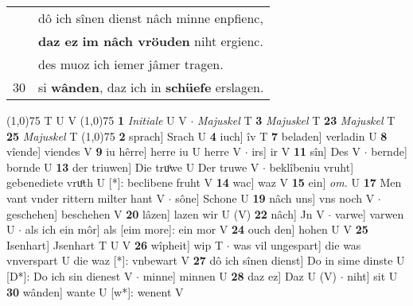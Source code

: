 \documentclass[8pt,a4paper,notitlepage]{article}
\begin{document}
\begin{table}[ht]
\begin{minipage}[t]{0.5\linewidth}
\begin{tabular}{rl}
 & dô ich sînen dienst nâch minne enpfienc,\\ 
 & \textbf{daz ez} \textbf{im nâch vröuden} niht ergienc.\\ 
 & des muoz ich iemer jâmer tragen.\\ 
30 & si \textbf{wânden}, daz ich in \textbf{schüefe} erslagen.\\ 
\end{tabular}
\scriptsize
\line(1,0){75} \newline
T U V \newline
\line(1,0){75} \newline
\textbf{1} \textit{Initiale} U V   $\cdot$ \textit{Majuskel} T  \textbf{3} \textit{Majuskel} T  \textbf{23} \textit{Majuskel} T  \textbf{25} \textit{Majuskel} T  \newline
\line(1,0){75} \newline
\textbf{2} sprach] Srach U \textbf{4} iuch] îv T \textbf{7} beladen] verladin U \textbf{8} vîende] viendes V \textbf{9} iu hêrre] herre iu U herre V  $\cdot$ irs] ir V \textbf{11} sîn] Des V  $\cdot$ bernde] bornde U \textbf{13} der triuwen] Die truͦwe U Der truwe V  $\cdot$ beklîbeniu vruht] gebenediete vruͦth U [*]: beclibene fruht V \textbf{14} wac] waz V \textbf{15} ein] \textit{om.} U \textbf{17} Men vant vnder rittern milter hant V  $\cdot$ sône] Schone U \textbf{19} nâch uns] vns noch V  $\cdot$ geschehen] beschehen V \textbf{20} lâzen] lazen wir U (V) \textbf{22} nâch] Jn V  $\cdot$ varwe] varwen U  $\cdot$ als ich ein môr] als [eim more]: ein mor V \textbf{24} ouch den] hohen U V \textbf{25} Isenhart] Jsenhart T U V \textbf{26} wîpheit] wip T  $\cdot$ was vil ungespart] die was vnverspart U die waz [*]: vnbewart V \textbf{27} dô ich sînen dienst] Do in sime dinste U [D*]: Do ich sin dienest V  $\cdot$ minne] minnen U \textbf{28} daz ez] Daz U (V)  $\cdot$ niht] sit U \textbf{30} wânden] wante U [w*]: wenent V \newline
\end{minipage}
\end{table}
\end{document}
